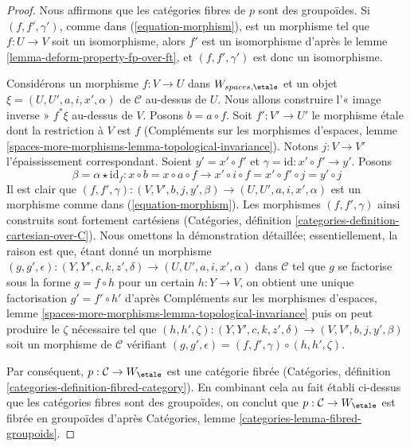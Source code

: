 \begin{proof}
Nous affirmons que les catégories fibres de $p$ sont des groupoïdes.
Si $(f, f', \gamma')$, comme dans (\ref{equation-morphism}),
est un morphisme tel que $f : U \to V$ soit un isomorphisme, alors
$f'$ est un isomorphisme d'après le lemme \ref{lemma-deform-property-fp-over-ft},
et $(f, f', \gamma')$ est donc un isomorphisme.

\medskip\noindent
Considérons un morphisme $f : V \to U$ dans $W_{spaces, \etale}$
et un objet $\xi = (U, U', a, i, x', \alpha)$
de $\mathcal{C}$ au-dessus de $U$. Nous allons construire l'« image inverse »
$f^*\xi$ au-dessus de $V$.
Posons $b = a \circ f$. Soit $f' : V' \to U'$ le morphisme \'etale
dont la restriction à $V$ est $f$ (Compléments sur les morphismes d'espaces,
lemme \ref{spaces-more-morphisms-lemma-topological-invariance}).
Notons $j : V \to V'$ l'épaississement correspondant.
Soient $y' = x' \circ f'$ et $\gamma = \text{id} : x' \circ f' \to y'$.
Posons
$$
\beta = \alpha \star \text{id}_f :
x \circ b = x \circ a \circ f \to
x' \circ i \circ f = x' \circ f' \circ j = y' \circ j
$$
Il est clair que $(f, f', \gamma) : (V, V', b, j, y', \beta) \to
(U, U', a, i, x', \alpha)$ est un morphisme comme dans
(\ref{equation-morphism}). Les morphismes $(f, f', \gamma)$
ainsi construits sont fortement cartésiens
(Catégories, définition \ref{categories-definition-cartesian-over-C}).
Nous omettons la démonstration détaillée; essentiellement, la raison est que,
étant donné un morphisme
$(g, g', \epsilon) : (Y, Y', c, k, z', \delta) \to (U, U', a, i, x', \alpha)$
dans $\mathcal{C}$ tel que $g$ se factorise sous la forme $g = f \circ h$ pour un certain
$h : Y \to V$, on obtient une unique factorisation $g' = f' \circ h'$
d'après Compléments sur les morphismes d'espaces,
lemme \ref{spaces-more-morphisms-lemma-topological-invariance}
puis on peut produire le $\zeta$ nécessaire tel que
$(h, h', \zeta) :  (Y, Y', c, k, z', \delta) \to
(V, V', b, j, y', \beta)$ soit un morphisme de $\mathcal{C}$
vérifiant $(g, g', \epsilon) = (f, f', \gamma) \circ (h, h', \zeta)$.

\medskip\noindent
Par conséquent, $p : \mathcal{C} \to W_\etale$ est une catégorie
fibrée (Catégories, définition \ref{categories-definition-fibred-category}).
En combinant cela au fait établi ci-dessus que les catégories fibres sont des groupoïdes,
on conclut que $p : \mathcal{C} \to W_\etale$ est
fibrée en groupoïdes d'après Catégories, lemme
\ref{categories-lemma-fibred-groupoids}.
\end{proof}

